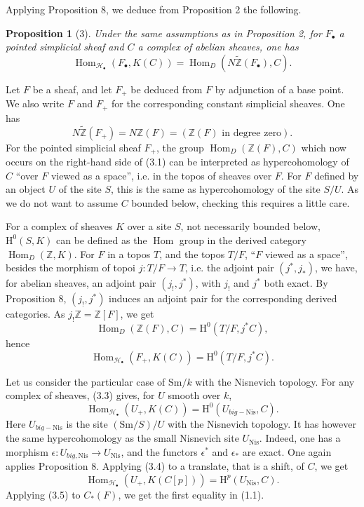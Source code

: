 \documentclass[11pt]{article}
\newcommand{\Z}{\mathbb Z}
\newcommand{\Nis}{\mathrm{Nis}}
\newcommand{\Sm}{\mathrm{Sm}}
\newcommand{\Hom}{\operatorname{Hom}}
\newcommand{\Hob}{\mathcal H_\bullet}
\newcommand{\ZZ}{\widetilde{\Z}}
\newcommand{\HH}{\mathrm H}
\theoremstyle{deligne}
\newtheorem*{proposition*}{Proposition}
\begin{document}
Applying Proposition 8, we deduce from Proposition 2 the following.

\begin{proposition*}[3]
Under the same assumptions as in Proposition 2, for \(F_\bullet\) a pointed simplicial sheaf and \(C\) a complex of abelian sheaves, one has
\[
  \Hom_{\Hob}(F_\bullet,K(C))=\Hom_D(N\ZZ(F_\bullet),C). \tag{3.1}
\]
\end{proposition*}

Let \(F\) be a sheaf, and let \(F_+\) be deduced from \(F\) by adjunction of a base point. We also write \(F\) and \(F_+\) for the corresponding constant simplicial sheaves. One has
\[
  N\ZZ(F_+)=N\Z(F)=(\Z(F)\text{ in degree zero}).
\]
For the pointed simplicial sheaf \(F_+\), the group \(\Hom_D(\Z(F),C)\) which now occurs on the right-hand side of (3.1) can be interpreted as hypercohomology of \(C\) ``over \(F\) viewed as a space'', i.e. in the topos of sheaves over \(F\). For \(F\) defined by an object \(U\) of the site \(S\), this is the same as hypercohomology of the site \(S/U\). As we do not want to assume \(C\) bounded below, checking this requires a little care.

For a complex of sheaves \(K\) over a site \(S\), not necessarily bounded below, \(\HH^0(S,K)\) can be defined as the \(\Hom\) group in the derived category \(\Hom_D(\Z,K)\). For \(F\) in a topos \(T\), and the topos \(T/F\), ``\(F\) viewed as a space'', besides the morphism of topoi \(j:T/F\to T\), i.e. the adjoint pair \((j^*,j_*)\), we have, for abelian sheaves, an adjoint pair \((j_!,j^*)\), with \(j_!\) and \(j^*\) both exact. By Proposition 8, \((j_!,j^*)\) induces an adjoint pair for the corresponding derived categories. As \(j_!\Z=\Z[F]\), we get
\[
  \Hom_D(\Z(F),C)=\HH^0(T/F,j^*C), \tag{3.2}
\]
hence
\[
  \Hom_{\Hob}(F_+,K(C))=\HH^0(T/F,j^*C). \tag{3.3}
\]

Let us consider the particular case of \(\Sm/k\) with the Nisnevich topology. For any complex of sheaves, (3.3) gives, for \(U\) smooth over \(k\),
\[
  \Hom_{\Hob}(U_+,K(C))=\HH^0(U_{big-\Nis},C). \tag{3.4}
\]
Here \(U_{big-\Nis}\) is the site \((\Sm/S)/U\) with the Nisnevich topology. It has however the same hypercohomology as the small Nisnevich site \(U_{\Nis}\). Indeed, one has a morphism \(\epsilon:U_{big,\Nis}\to U_{\Nis}\), and the functors \(\epsilon^*\) and \(\epsilon_*\) are exact. One again applies Proposition 8. Applying (3.4) to a translate, that is a shift, of \(C\), we get
\[
  \Hom_{\Hob}(U_+,K(C[p]))=\HH^p(U_{\Nis},C). \tag{3.5}
\]
Applying (3.5) to \(C_*(F)\), we get the first equality in (1.1).
\end{document}
